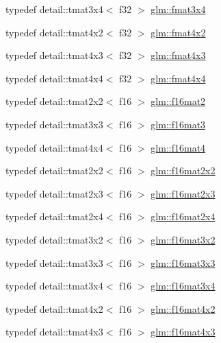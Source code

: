 \begin{DoxyCompactItemize}
\item 
typedef detail\+::tmat3x4$<$ f32 $>$ \hyperlink{group__gtc__type__precision_ga25970f79d7650ec2d422119fe1e56c3f}{glm\+::fmat3x4}
\item 
typedef detail\+::tmat4x2$<$ f32 $>$ \hyperlink{group__gtc__type__precision_ga532054b5f4c6f8cadec059d83e188104}{glm\+::fmat4x2}
\item 
typedef detail\+::tmat4x3$<$ f32 $>$ \hyperlink{group__gtc__type__precision_ga55d2df2d8b1b94d495125530fac1da69}{glm\+::fmat4x3}
\item 
typedef detail\+::tmat4x4$<$ f32 $>$ \hyperlink{group__gtc__type__precision_gad011717dba7e15802233b335618d8969}{glm\+::fmat4x4}
\item 
typedef detail\+::tmat2x2$<$ f16 $>$ \hyperlink{group__gtc__type__precision_gaa0e6cf15c6bf4136f596ed129a55ae6b}{glm\+::f16mat2}
\item 
typedef detail\+::tmat3x3$<$ f16 $>$ \hyperlink{group__gtc__type__precision_ga565f29588755e09a686049d0f0c91af5}{glm\+::f16mat3}
\item 
typedef detail\+::tmat4x4$<$ f16 $>$ \hyperlink{group__gtc__type__precision_gab8417233c8f428e6e46bf77c7fc11200}{glm\+::f16mat4}
\item 
typedef detail\+::tmat2x2$<$ f16 $>$ \hyperlink{group__gtc__type__precision_ga1f4b12c53051603b62e6fa69e3b7a98b}{glm\+::f16mat2x2}
\item 
typedef detail\+::tmat2x3$<$ f16 $>$ \hyperlink{group__gtc__type__precision_ga8705b9a5a043c443df698f3274c7fc0e}{glm\+::f16mat2x3}
\item 
typedef detail\+::tmat2x4$<$ f16 $>$ \hyperlink{group__gtc__type__precision_ga0764ac8adf2ac8909c100f9ce21eecba}{glm\+::f16mat2x4}
\item 
typedef detail\+::tmat3x2$<$ f16 $>$ \hyperlink{group__gtc__type__precision_ga52ebf7495711e769a9191a10f668a28b}{glm\+::f16mat3x2}
\item 
typedef detail\+::tmat3x3$<$ f16 $>$ \hyperlink{group__gtc__type__precision_gab97d7f311dd03dcbce714197878685fa}{glm\+::f16mat3x3}
\item 
typedef detail\+::tmat3x4$<$ f16 $>$ \hyperlink{group__gtc__type__precision_gaebfd661385fe915a713b91654169a455}{glm\+::f16mat3x4}
\item 
typedef detail\+::tmat4x2$<$ f16 $>$ \hyperlink{group__gtc__type__precision_ga1f933a7c0b489807dc22537b80f2e5f2}{glm\+::f16mat4x2}
\item 
typedef detail\+::tmat4x3$<$ f16 $>$ \hyperlink{group__gtc__type__precision_gaa0c9c69c19bf90bb73e455a1e61f7114}{glm\+::f16mat4x3}

\end{DoxyCompactItemize}
